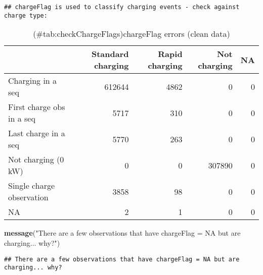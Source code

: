 \documentclass[]{article}
\newenvironment{Shaded}{\begin{snugshade}}{\end{snugshade}}
\newcommand{\DataTypeTok}[1]{\textcolor[rgb]{0.13,0.29,0.53}{#1}}
\newcommand{\KeywordTok}[1]{\textcolor[rgb]{0.13,0.29,0.53}{\textbf{#1}}}
\newcommand{\NormalTok}[1]{#1}
\newcommand{\OperatorTok}[1]{\textcolor[rgb]{0.81,0.36,0.00}{\textbf{#1}}}
\newcommand{\StringTok}[1]{\textcolor[rgb]{0.31,0.60,0.02}{#1}}
\begin{document}
\begin{verbatim}
## chargeFlag is used to classify charging events - check against charge type:
\end{verbatim}

\begin{Shaded}
\end{Shaded}

\begin{table}[t]

\caption{(\#tab:checkChargeFlags)chargeFlag errors (clean data)}
\centering
\begin{tabular}{l|r|r|r|r}
\hline
  & Standard charging & Rapid charging & Not charging & NA\\
\hline
Charging in a seq & 612644 & 4862 & 0 & 0\\
\hline
First charge obs in a seq & 5717 & 310 & 0 & 0\\
\hline
Last charge in a seq & 5770 & 263 & 0 & 0\\
\hline
Not charging (0 kW) & 0 & 0 & 307890 & 0\\
\hline
Single charge observation & 3858 & 98 & 0 & 0\\
\hline
NA & 2 & 1 & 0 & 0\\
\hline
\end{tabular}
\end{table}

\begin{Shaded}
\begin{Highlighting}[]
\KeywordTok{message}\NormalTok{(}\StringTok{"There are a few observations that have chargeFlag = NA but are charging... why?"}\NormalTok{)}
\end{Highlighting}
\end{Shaded}

\begin{verbatim}
## There are a few observations that have chargeFlag = NA but are charging... why?
\end{verbatim}
\end{document}
